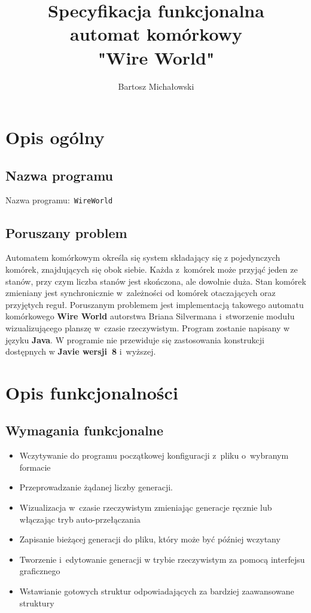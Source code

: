 \documentclass[a4paper,11pt]{article}
\author{Bartosz Michałowski}
\title{
	\Huge Specyfikacja funkcjonalna \\
	automat komórkowy\\
	\textbf{"Wire World"}
}
\begin{document}
 
	\maketitle 
	\newpage
	\tableofcontents 
	\newpage
	\section {Opis ogólny}
	\subsection{Nazwa programu} 
	Nazwa programu:~\texttt{WireWorld}
	\subsection{Poruszany problem}
	Automatem komórkowym określa się system składający się z pojedynczych komórek, znajdujących się obok siebie. Każda z~komórek może przyjąć jeden ze stanów, przy czym liczba stanów jest skończona, ale dowolnie duża. Stan komórek zmieniany jest synchronicznie w~zależności od komórek otaczających oraz przyjętych reguł. Poruszanym problemem jest implementacją takowego automatu komórkowego \textbf{Wire World} autorstwa Briana Silvermana i~stworzenie modułu wizualizującego planszę w~czasie rzeczywistym. Program zostanie napisany w języku \textbf{Java}. W programie nie przewiduje się zastosowania konstrukcji dostępnych w \textbf{Javie wersji~8} i~wyższej. 
	\newpage
	\section{Opis funkcjonalności}
		\subsection{Wymagania funkcjonalne}
		\begin{itemize}
		\item Wczytywanie do programu początkowej konfiguracji z~pliku o~wybranym formacie
		\item Przeprowadzanie żądanej liczby generacji.
		\item Wizualizacja w~czasie rzeczywistym zmieniając generacje ręcznie lub włączając tryb auto-przełączania
		\item Zapisanie bieżącej generacji do pliku, który może być później wczytany
		\item Tworzenie i~edytowanie generacji w trybie rzeczywistym za pomocą interfejsu graficznego
		\item Wstawianie gotowych struktur odpowiadających za bardziej zaawansowane struktury
	  \end{itemize}
\end{document}
